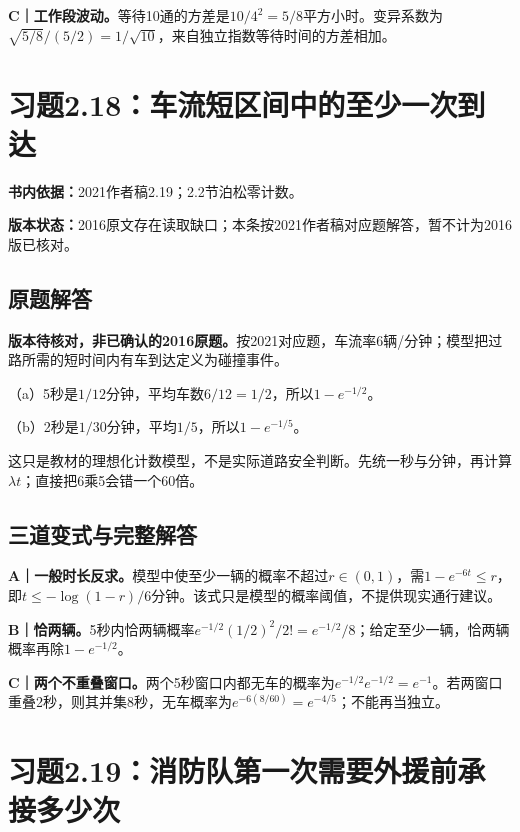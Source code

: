 \documentclass[
  11pt,
  a4paper,
  UTF8,fontset=fandol]{ctexart}
\let\OldSection\section
\renewcommand{\section}{\Needspace{7\baselineskip}\OldSection}
\let\OldSubsection\subsection
\renewcommand{\subsection}{\Needspace{5\baselineskip}\OldSubsection}
\begin{document}
\textbf{C｜工作段波动。}等待10通的方差是\(10/4^2=5/8\)平方小时。变异系数为\(\sqrt{5/8}/(5/2)=1/\sqrt{10}\)，来自独立指数等待时间的方差相加。

\newpage

\section{习题2.18：车流短区间中的至少一次到达}\label{ux4e60ux98982.18ux8f66ux6d41ux77edux533aux95f4ux4e2dux7684ux81f3ux5c11ux4e00ux6b21ux5230ux8fbe}

\textbf{书内依据：}2021作者稿2.19；2.2节泊松零计数。

\textbf{版本状态：}2016原文存在读取缺口；本条按2021作者稿对应题解答，暂不计为2016版已核对。

\subsection{原题解答}\label{ux539fux9898ux89e3ux7b54-17}

\textbf{版本待核对，非已确认的2016原题。}按2021对应题，车流率6辆/分钟；模型把过路所需的短时间内有车到达定义为碰撞事件。

（a）5秒是\(1/12\)分钟，平均车数\(6/12=1/2\)，所以\(\boxed{1-e^{-1/2}}\)。

（b）2秒是\(1/30\)分钟，平均\(1/5\)，所以\(\boxed{1-e^{-1/5}}\)。

这只是教材的理想化计数模型，不是实际道路安全判断。先统一秒与分钟，再计算\(\lambda t\)；直接把6乘5会错一个60倍。

\subsection{三道变式与完整解答}\label{ux4e09ux9053ux53d8ux5f0fux4e0eux5b8cux6574ux89e3ux7b54-17}

\textbf{A｜一般时长反求。}模型中使至少一辆的概率不超过\(r\in(0,1)\)，需\(1-e^{-6t}\le r\)，即\(t\le-\log(1-r)/6\)分钟。该式只是模型的概率阈值，不提供现实通行建议。

\textbf{B｜恰两辆。}5秒内恰两辆概率\(e^{-1/2}(1/2)^2/2!=e^{-1/2}/8\)；给定至少一辆，恰两辆概率再除\(1-e^{-1/2}\)。

\textbf{C｜两个不重叠窗口。}两个5秒窗口内都无车的概率为\(e^{-1/2}e^{-1/2}=e^{-1}\)。若两窗口重叠2秒，则其并集8秒，无车概率为\(e^{-6(8/60)}=e^{-4/5}\)；不能再当独立。

\newpage

\section{习题2.19：消防队第一次需要外援前承接多少次}\label{ux4e60ux98982.19ux6d88ux9632ux961fux7b2cux4e00ux6b21ux9700ux8981ux5916ux63f4ux524dux627fux63a5ux591aux5c11ux6b21}
\end{document}
